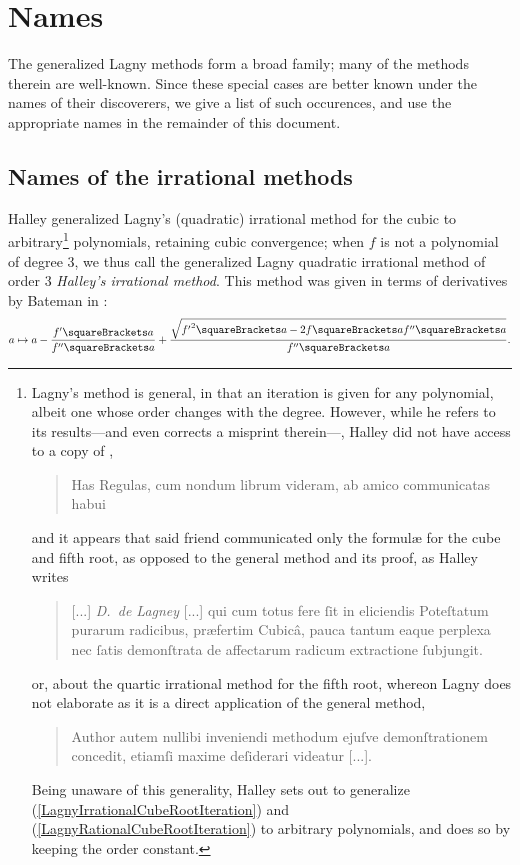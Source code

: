 ﻿\documentclass[10pt, a4paper, twoside]{basestyle}
\begin{document}
\section*{Names}
The generalized Lagny methods form a broad family; many of the methods therein are well-known.
Since these special cases are better known under the names of their discoverers, we give a list of such
occurences, and use the appropriate names in the remainder of this document.
\subsection*{Names of the irrational methods}
Halley generalized Lagny's (quadratic) irrational method for the cubic to
arbitrary\footnote{Lagny's method is general, in that an iteration is given for any
polynomial, albeit one whose order changes with the degree. However, while he refers to its
results---and even corrects a misprint therein---, Halley
did not have access to a copy of \cite{FantetdeLagny1692},
\begin{quote}
Has Regulas, cum nondum librum videram, ab amico communicatas habui
\end{quote}
and it appears that said friend communicated only the formulæ for the cube and fifth root, as opposed to the
general method and its proof, as Halley writes
\begin{quote}
[...] \emph{D.~de Lagney} [...] qui cum totus fere ſit in eliciendis Poteſtatum purarum radicibus,
præfertim Cubicâ, pauca tantum eaque perplexa nec ſatis demonſtrata de affectarum radicum
extractione ſubjungit.
\end{quote}
or, about the quartic irrational method for the fifth root, whereon Lagny does not elaborate as
it is a direct application of the general method,
\begin{quote}
Author autem nullibi inveniendi methodum ejuſve demonſtrationem concedit,
etiamſi maxime deſiderari videatur [...].
\end{quote}
Being unaware of this generality, Halley sets out to generalize (\ref{LagnyIrrationalCubeRootIteration}) and (\ref{LagnyRationalCubeRootIteration}) to
arbitrary polynomials, and does so by keeping the order constant.}
polynomials, retaining cubic convergence; when $f$ is
not a polynomial of degree $3$, we thus call the generalized Lagny quadratic irrational method of
order $3$ \emph{Halley's irrational method}.
This method was given in terms of derivatives by Bateman in \cite[12]{Bateman1938}:\[
\FunctionBody{a}{a-\frac{f'\of{a}}}{f''\of{a}}+\frac{\sqrt{{f'}^2\of{a}-2f\of{a}f''\of{a}}}{f''\of{a}}\text.
\]
\end{document}
